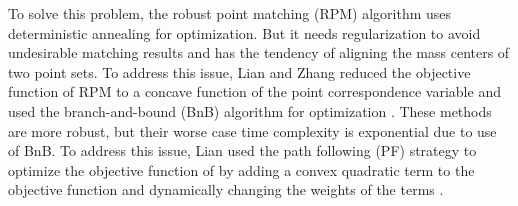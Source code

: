 \documentclass[11pt,bezier,]{article}
\begin{document}
To solve this problem,
the robust point matching (RPM) algorithm \cite{RPM_TPS} 
uses deterministic annealing for optimization.
But it needs regularization to avoid  undesirable matching results and
has the tendency of aligning the mass centers of two point sets.
To address this issue,
Lian and Zhang reduced
the objective function of RPM to a  concave function of the point correspondence variable
and  used the branch-and-bound (BnB) algorithm for optimization  \cite{RPM_concave,RPM_model_occlude}.
These methods are  more  robust, %
but their  worse case time complexity is  exponential  due to use of BnB.
To address this issue,
Lian used the path following (PF) strategy \cite{GM_PF_quadratic} to optimize the objective function of \cite{RPM_model_occlude}
by adding a convex quadratic term to the objective function and dynamically changing the weights of the  terms
\cite{RPM_PF_aff}.
\end{document}
